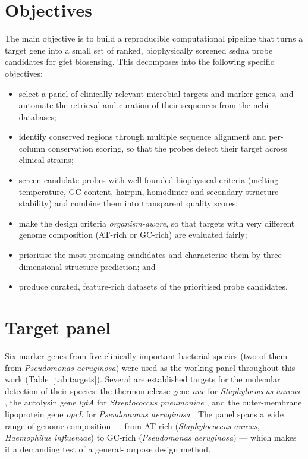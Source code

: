 \section{Objectives}
\label{sec:objectives}

The main objective is to build a reproducible computational pipeline that turns a target gene into a small
set of ranked, biophysically screened \acrshort{ssdna} probe candidates for \acrshort{gfet} biosensing.
This decomposes into the following specific objectives:

\begin{itemize}
  \item select a panel of clinically relevant microbial targets and marker genes, and automate the
        retrieval and curation of their sequences from the \acrshort{ncbi} databases;
  \item identify conserved regions through multiple sequence alignment and per-column conservation
        scoring, so that the probes detect their target across clinical strains;
  \item screen candidate probes with well-founded biophysical criteria (melting temperature, GC content,
        hairpin, homodimer and secondary-structure stability) and combine them into transparent quality
        scores;
  \item make the design criteria \emph{organism-aware}, so that targets with very different genome
        composition (AT-rich or GC-rich) are evaluated fairly;
  \item prioritise the most promising candidates and characterise them by three-dimensional structure
        prediction; and
  \item produce curated, feature-rich datasets of the prioritised probe candidates.
\end{itemize}

\section{Target panel}
\label{sec:targets}

Six marker genes from five clinically important bacterial species (two of them from
\emph{Pseudomonas aeruginosa}) were used as the working panel throughout this work
(Table~\ref{tab:targets}). Several are established targets for the molecular detection of their
species: the thermonuclease gene \emph{nuc} for \emph{Staphylococcus aureus} \citep{brakstad1992}, the
autolysin gene \emph{lytA} for \emph{Streptococcus pneumoniae} \citep{carvalho2007}, and the
outer-membrane lipoprotein gene \emph{oprL} for \emph{Pseudomonas aeruginosa} \citep{devos1997}. The panel
spans a wide range of genome composition --- from AT-rich (\emph{Staphylococcus aureus},
\emph{Haemophilus influenzae}) to GC-rich (\emph{Pseudomonas aeruginosa}) --- which makes it a demanding
test of a general-purpose design
method.

